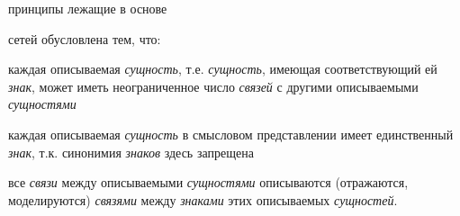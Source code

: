 \begin{SCn}
\begin{scnsubstruct}
\begin{scnrelfromvector}{принципы лежащие в основе}
{{					сетей} обусловлена тем, что:
				\begin{scnitemize}
					\item каждая описываемая \textit{сущность}, т.е.
					\textit{сущность}, имеющая соответствующий ей \textit{знак}, может иметь
					неограниченное число \textit{связей} с другими описываемыми \textit{сущностями}
					\item каждая описываемая \textit{сущность} в смысловом
					представлении имеет единственный \textit{знак}, т.к. синонимия \textit{знаков}
					здесь запрещена
					\item все \textit{связи} между описываемыми \textit{сущностями}
					описываются (отражаются, моделируются) \textit{связями} между \textit{знаками}
					этих описываемых \textit{сущностей}.
				\end{scnitemize}
				}
		\end{scnrelfromvector}



\end{scnsubstruct}
\end{SCn}
